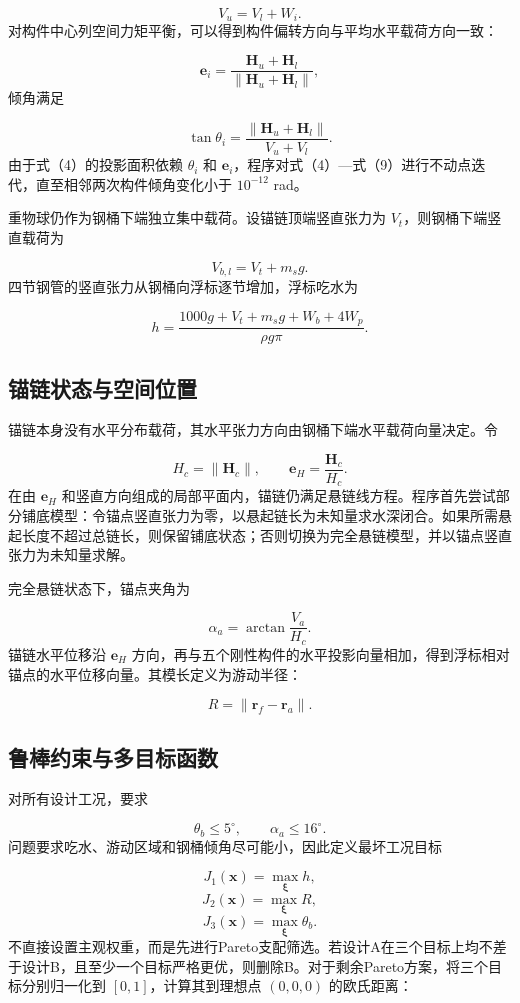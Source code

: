 \[
V_u=V_l+W_i. \tag{7}
\]
对构件中心列空间力矩平衡，可以得到构件偏转方向与平均水平载荷方向一致：

\[
\boldsymbol e_i=
\frac{\boldsymbol H_u+\boldsymbol H_l}
{\|\boldsymbol H_u+\boldsymbol H_l\|}, \tag{8}
\]
倾角满足

\[
\tan\theta_i=
\frac{\|\boldsymbol H_u+\boldsymbol H_l\|}
{V_u+V_l}. \tag{9}
\]
由于式（4）的投影面积依赖 \(\theta_i\) 和 \(\boldsymbol e_i\)，程序对式（4）—式（9）进行不动点迭代，直至相邻两次构件倾角变化小于 \(10^{-12}\) rad。

重物球仍作为钢桶下端独立集中载荷。设锚链顶端竖直张力为 \(V_t\)，则钢桶下端竖直载荷为

\[
V_{b,l}=V_t+m_sg.
\]
四节钢管的竖直张力从钢桶向浮标逐节增加，浮标吃水为

\[
h=\frac{1000g+V_t+m_sg+W_b+4W_p}{\rho g\pi}. \tag{10}
\]
\subsection{锚链状态与空间位置}
锚链本身没有水平分布载荷，其水平张力方向由钢桶下端水平载荷向量决定。令

\[
H_c=\|\boldsymbol H_c\|,
\qquad
\boldsymbol e_H=\frac{\boldsymbol H_c}{H_c}.
\]
在由 \(\boldsymbol e_H\) 和竖直方向组成的局部平面内，锚链仍满足悬链线方程。程序首先尝试部分铺底模型：令锚点竖直张力为零，以悬起链长为未知量求水深闭合。如果所需悬起长度不超过总链长，则保留铺底状态；否则切换为完全悬链模型，并以锚点竖直张力为未知量求解。

完全悬链状态下，锚点夹角为

\[
\alpha_a=\arctan\frac{V_a}{H_c}. \tag{11}
\]
锚链水平位移沿 \(\boldsymbol e_H\) 方向，再与五个刚性构件的水平投影向量相加，得到浮标相对锚点的水平位移向量。其模长定义为游动半径：

\[
R=\|\boldsymbol r_f-\boldsymbol r_a\|. \tag{12}
\]
\subsection{鲁棒约束与多目标函数}
对所有设计工况，要求

\[
\theta_b\le5^\circ,
\qquad
\alpha_a\le16^\circ. \tag{13}
\]
问题要求吃水、游动区域和钢桶倾角尽可能小，因此定义最坏工况目标

\[
J_1(\boldsymbol x)=\max_{\boldsymbol\xi}h,
\]
\[
J_2(\boldsymbol x)=\max_{\boldsymbol\xi}R,
\]
\[
J_3(\boldsymbol x)=\max_{\boldsymbol\xi}\theta_b. \tag{14}
\]
不直接设置主观权重，而是先进行Pareto支配筛选。若设计A在三个目标上均不差于设计B，且至少一个目标严格更优，则删除B。对于剩余Pareto方案，将三个目标分别归一化到 \([0,1]\)，计算其到理想点 \((0,0,0)\) 的欧氏距离：


